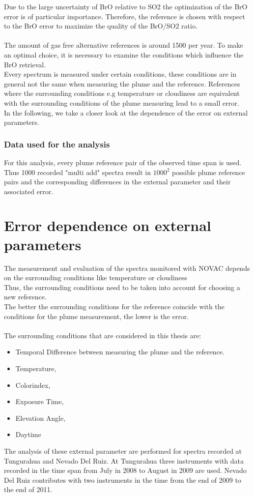 Due to the large uncertainty of BrO relative to SO2 the optimization of the BrO error is of particular importance. Therefore, the reference is chosen with respect to the BrO error to maximize the quality of the BrO/SO2 ratio. \\
\\
The amount of gas free alternative references is around 1500 per year. To make an optimal choice, it is necessary to examine the conditions which influence the BrO retrieval.\\
Every spectrum is measured under certain conditions, these conditions are in general not the same when measuring the plume and the reference. References where the surrounding conditions e.g temperature or cloudiness are equivalent with the surrounding conditions of the  plume measuring lead to a small error.\\
In the following, we take a closer look at the dependence of the  error on external parameters. 
%
\subsubsection*{Data used for the analysis}
For this analysis, every plume reference pair of the observed time span is used. Thus 1000 recorded "multi add" spectra result in $1000^2$ possible plume reference pairs and the corresponding differences in the external parameter and their associated  error.


\section{ Error dependence on external parameters \label{Chap:BROErr}}
The measurement and evaluation of the spectra monitored with NOVAC depends on the surrounding conditions like temperature or cloudiness \citep{lubcke2014optical}\\
Thus, the surrounding conditions need to be taken into account for choosing a new reference.\\
The better the surrounding conditions for the reference coincide with the conditions for the plume measurement, the lower is the  error. \\
	\\
The surrounding conditions that are considered in this thesis are: 
	\begin{itemize}
		\item Temporal Difference between measuring the plume and the reference.
		\item Temperature, 
		\item Colorindex, 
		\item Exposure Time, 
		\item Elevation Angle, 
		\item Daytime 	
	\end{itemize}
The analysis of these external parameter are performed for spectra recorded at Tungurahua and Nevado Del Ruiz. At Tungurahua three instruments with data recorded in the time span from July in 2008 to August in 2009 are used. Nevado Del Ruiz contributes with two instruments in the time from the end of 2009 to the end of 2011.
%	
